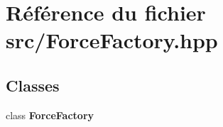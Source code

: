 \section{Référence du fichier src/\-Force\-Factory.hpp}
\label{_force_factory_8hpp}
\subsection*{Classes}
\begin{DoxyCompactItemize}
\item 
class {\bf Force\-Factory}
\end{DoxyCompactItemize}
